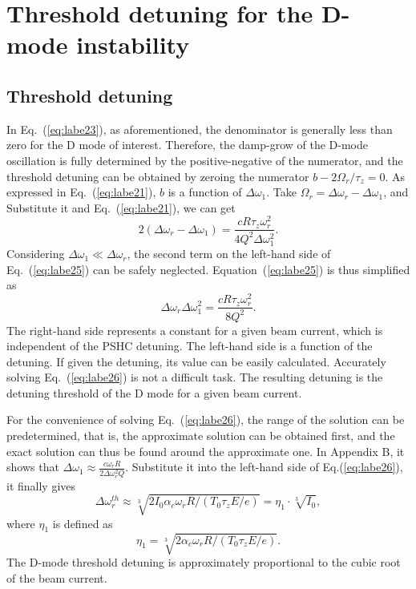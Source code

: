 \documentclass[%
 reprint,
 amsmath,amssymb,
 aps,
]{revtex4-1}
\begin{document}
\section{\label{sec:level4} Threshold detuning for the D-mode instability}
\subsection{\label{sec:level4.1} Threshold detuning}
In Eq.~(\ref{eq:labe23}), as aforementioned, the denominator is generally less than zero for the D mode of interest. Therefore, the damp-grow of the D-mode oscillation is fully determined by the positive-negative of the numerator, and the threshold detuning can be obtained by zeroing the numerator $b-2\Omega_r/\tau_z =0$.  As expressed in Eq.~(\ref{eq:labe21}), $b$ is a function of $\Delta\omega_1$. Take $\Omega_r=\Delta\omega_r-\Delta\omega_1$, and Substitute it and Eq.~(\ref{eq:labe21}), we can get 
\begin{equation}\label{eq:labe25}
   2(\Delta\omega_r-\Delta\omega_1)=\frac{c R\tau_z\omega^2_r}{4Q^2\Delta\omega^2_1}.
\end{equation}
Considering $\Delta\omega_1 \ll \Delta\omega_r$, the second term on the left-hand side of Eq.~(\ref{eq:labe25}) can be safely neglected. Equation~(\ref{eq:labe25}) is thus simplified as
\begin{equation}\label{eq:labe26}
   \Delta\omega_r\Delta\omega^2_1=\frac{c R\tau_z\omega^2_r}{8Q^2}.
\end{equation}
The right-hand side represents a constant for a given beam current, which is independent of the PSHC detuning. The left-hand side is a function of the detuning. If given the detuning, its value can be easily calculated. Accurately solving Eq.~(\ref{eq:labe26}) is not a difficult task. The resulting detuning is the detuning threshold of the D mode for a given beam current.

For the convenience of solving Eq.~(\ref{eq:labe26}), the range of the solution can be predetermined, that is, the approximate solution can be obtained first, and the exact solution can thus be found around the approximate one. In Appendix B, it shows that $\Delta\omega_1\approx \frac{c\omega_rR}{2\Delta\omega^2_r Q}$. Substitute it into the left-hand side of Eq.(\ref{eq:labe26}), it finally gives
\begin{equation}\label{eq:labe27}
   \Delta\omega^{th}_r \approx \sqrt[3]{2I_0 \alpha_c \omega_r R/(T_0 \tau_z E/e)}=\eta_1 \cdot \sqrt[3]{I_0},
\end{equation}
where $\eta_1$ is defined as
\begin{equation}\label{eq:labe28}
   \eta_1=\sqrt[3]{2 \alpha_c \omega_r R/(T_0 \tau_z E/e)}.
\end{equation}
The D-mode threshold detuning is approximately proportional to the cubic root of the beam current. 
\end{document}
